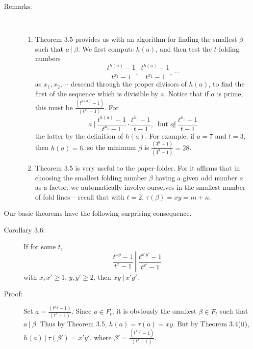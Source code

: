 \begin{description}
  \item[Remarks:] $\ $
    \begin{enumerate}[\hspace{1cm}(i)]
      \item Theorem 3.5 provides us with an algorithm for finding the smallest $\beta$ such that $a\ |\ \beta$. We first compute $h(a)$, and then test the $t$-folding numbers
        \begin{equation*}
        \frac{t^{h(a)}-1}{t^{x_{1}}-1},\ \frac{t^{h(a)}-1}{t^{x_{2}}-1},\ \cdots
        \end{equation*}
        as $x_{1}, x_{2}, \cdots$ descend through the proper divisors of $h(a)$, to find the first of the sequence which is divisible by $a$. Notice that if $a$ is prime, this must be $\frac{(t^{h(a)}-1)}{(t^{x_{1}}-1)}$. For
        \begin{equation*}
        a\ |\ \frac{t^{h(a)}-1}{t^{x_1}-1} \cdot \frac{t^{x_1}-1}{t-1},\ \text{ but } a \not|\ \frac{t^{x_1}-1}{t-1}
        \end{equation*}
        the latter by the definition of $h(a)$. For example, if $a = 7$ and $t = 3$, then $h(a) = 6$, so the minimum $\beta$ is $\frac{(3^{6}-1)}{(3^{3}-1)} = 28$.
      \item Theorem 3.5 is very useful to the paper-folder. For it affirms that in choosing the smallest folding number $\beta$ having a given odd number $a$ as a factor, we automatically involve ourselves in the smallest number of fold lines -- recall that with $t = 2$, $\tau(\beta) = xy = m+n$.
    \end{enumerate}

\end{description}

Our basic theorems have the following surprising consequence.

\begin{description}

  \item[Corollary 3.6:] If for some $t$,
    \begin{equation*}
    \frac{t^{xy}-1}{t^{x}-1}\ \left|\ \frac{t^{x'y'}-1}{t^{x'}-1} \right.
    \end{equation*}
    with $x,x' \geq 1$, $y,y' \geq 2$, then $xy\ |\ x' y'$.

  \item[Proof:] Set $a = \frac{(t^{xy}-1)}{(t^{x}-1)}$. Since $a \in F_{t}$, it is obviously the smallest $\beta \in F_{t}$ such that $a\ |\ \beta$. Thus by Theorem 3.5, $h(a) = \tau(a) = xy$. But by Theorem 3.4(ii), $h(a)\ |\ \tau(\beta') = x' y'$, where $\beta' = \frac{(t^{x'y'}-1)}{(t^{x}-1)}$.

\end{description}

